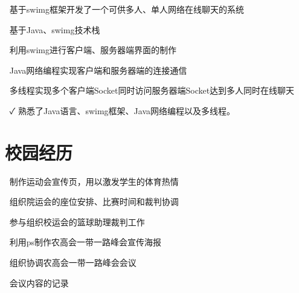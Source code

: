 \documentclass[14pt]{resume}
\begin{document}
\begin{onehalfspacing}
\begin{itemize}
    \item[\faFlagO] 基于swimg框架开发了一个可供多人、单人网络在线聊天的系统
    \item[\faFlagO] 基于Java、swimg技术栈
    \item[\faCode] 利用swimg进行客户端、服务器端界面的制作
     \item[\faCode] Java网络编程实现客户端和服务器端的连接通信
      \item[\faCode] 多线程实现多个客户端Socket同时访问服务器端Socket达到多人同时在线聊天
    \item[\faCheck] 熟悉了Java语言、swimg框架、Java网络编程以及多线程。
\end{itemize}
\end{onehalfspacing}

\section{\faUniversity\ 校园经历}

\begin{onehalfspacing}
\begin{itemize}
    \item[\faFlagO] 制作运动会宣传页，用以激发学生的体育热情
    \item[\faFlagO] 组织院运会的座位安排、比赛时间和裁判协调
    \item[\faFlagO] 参与组织校运会的篮球助理裁判工作
\end{itemize}
\end{onehalfspacing}

\begin{onehalfspacing}
\begin{itemize}
    \item[\faFlagO] 利用ps制作农高会一带一路峰会宣传海报
    \item[\faFlagO]组织协调农高会一带一路峰会会议
    \item[\faFlagO] 会议内容的记录
\end{itemize}
\end{onehalfspacing}
\end{document}
